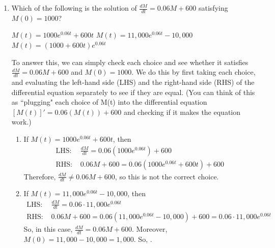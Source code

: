 \documentclass{article}
\begin{document}
\begin{enumerate}
\item  \label{moneybags-continuous-compounding-deposit-solution} 


  
  \begin{problem}[\vfill\newpage]
    Which of the following is the solution of $\displaystyle \frac{dM}{dt}
    = 0.06M + 600$ satisfying $M(0) = 1000$?
    \begin{enumerate}[label=\protect\maybecircle{\roman*.},ref=\roman*]
    \plainitem $M(t) = 1000 e^{0.06 t} + 600t$
    \circleitem \label{moneybags-continuous-compounding-deposit-solution-right-choice}
      $M(t) = 11,000 e^{0.06 t} - 10,000$ 
    \plainitem $M(t) = (1000 + 600 t) e^{0.06 t}$
    \end{enumerate}
  \end{problem}

  \begin{solution}
    To answer this, we can simply check each choice and see whether it
    satisfies $\frac{dM}{dt} = 0.06 M + 600$ and $M(0) = 1000$. We do this by first taking each choice, and evaluating the left-hand side (LHS) and the right-hand side (RHS) of the differential equation separately to see if they are equal. (You can think of this as ``plugging" each choice of M(t) into the differential equation $[M(t)]'=0.06(M(t))+600$ and checking if it makes the equation work.)

    \begin{enumerate}[label=\roman*.]
    \item If $M(t) = 1000 e^{0.06 t} + 600 t$, then
      \begin{align*}
        \text{LHS: } &\frac{dM}{dt} = 0.06 \left( 1000 e^{0.06 t} \right) + 600 \\
        \text{RHS: }&0.06 M + 600 = 0.06 \left( 1000 e^{0.06 t} + 600 t \right) + 600
      \end{align*}
      Therefore, $\frac{dM}{dt} \neq 0.06 M + 600$, so this is not the
      correct choice.

    \item If $M(t) = 11,000 e^{0.06 t} - 10,000$, then
      \begin{align*}
        \text{LHS: }&\frac{dM}{dt} = 0.06 \cdot 11,000 e^{0.06 t} \\
        \text{RHS: }&0.06 M + 600  = 0.06 \left( 11,000 e^{0.06 t} - 10,000 \right) +
        600 = 0.06 \cdot 11,000 e^{0.06 t}
      \end{align*}
      So, in this case, $\frac{dM}{dt} = 0.06 M + 600$.  Moreover, $M(0) =
      11,000 - 10,000 = 1,000$.  So, .


\end{enumerate}
\end{solution}
\end{enumerate}
\end{document}
